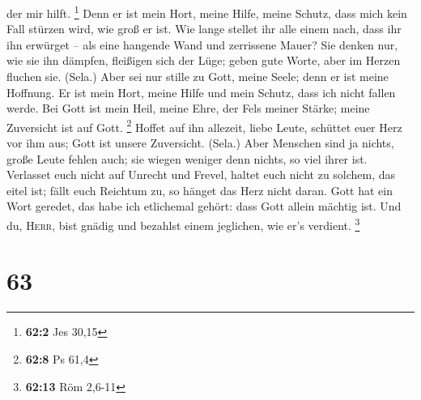 der mir hilft. \footnote{\textbf{62:2} Jes 30,15}  Denn er
ist mein Hort, meine Hilfe, meine Schutz, dass mich kein Fall stürzen
wird, wie groß er ist.  Wie lange stellet ihr alle einem
nach, dass ihr ihn erwürget -- als eine hangende Wand und zerrissene
Mauer?  Sie denken nur, wie sie ihn dämpfen, fleißigen
sich der Lüge; geben gute Worte, aber im Herzen fluchen sie. (Sela.)
 Aber sei nur stille zu Gott, meine Seele; denn er ist
meine Hoffnung.  Er ist mein Hort, meine Hilfe und mein
Schutz, dass ich nicht fallen werde.  Bei Gott ist mein
Heil, meine Ehre, der Fels meiner Stärke; meine Zuversicht ist auf Gott.
\footnote{\textbf{62:8} Ps 61,4}  Hoffet auf ihn allezeit,
liebe Leute, schüttet euer Herz vor ihm aus; Gott ist unsere Zuversicht.
(Sela.)  Aber Menschen sind ja nichts, große Leute fehlen
auch; sie wiegen weniger denn nichts, so viel ihrer ist. 
Verlasset euch nicht auf Unrecht und Frevel, haltet euch nicht zu
solchem, das eitel ist; fällt euch Reichtum zu, so hänget das Herz nicht
daran.  Gott hat ein Wort geredet, das habe ich
etlichemal gehört: dass Gott allein mächtig ist.  Und du,
\textsc{Herr}, bist gnädig und bezahlst einem jeglichen, wie er's
verdient. \footnote{\textbf{62:13} Röm 2,6-11}

\hypertarget{section-24}{%
\section{63}\label{section-24}}

